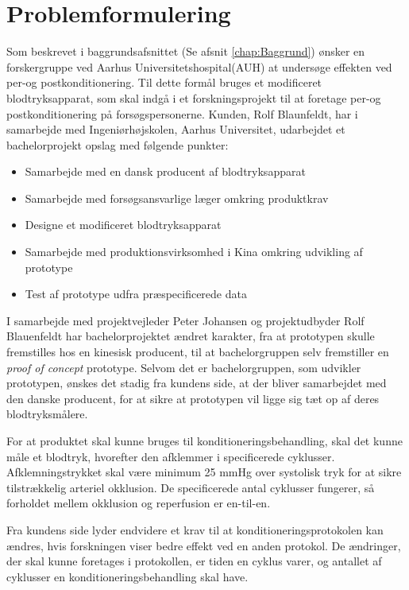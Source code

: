 \chapter{Problemformulering}\label{title:problemformulering}
Som beskrevet i baggrundsafsnittet (Se afsnit \ref{chap:Baggrund}) ønsker en forskergruppe ved Aarhus Universitetshospital(AUH) at undersøge effekten ved per-og postkonditionering. Til dette formål bruges et modificeret blodtryksapparat, som skal indgå i et forskningsprojekt til at foretage per-og postkonditionering på forsøgspersonerne. Kunden, Rolf Blaunfeldt, har i samarbejde med Ingeniørhøjskolen, Aarhus Universitet, udarbejdet et bachelorprojekt opslag med følgende punkter:
\begin{itemize}
	\item Samarbejde med en dansk producent af blodtryksapparat
	\item Samarbejde med forsøgsansvarlige læger omkring produktkrav
	\item Designe et modificeret blodtryksapparat
	\item Samarbejde med produktionsvirksomhed i Kina omkring udvikling af prototype 
	\item Test af prototype udfra præspecificerede data
\end{itemize}

I samarbejde med projektvejleder Peter Johansen og projektudbyder Rolf Blauenfeldt har bachelorprojektet ændret karakter, fra at prototypen skulle fremstilles hos en kinesisk producent, til at bachelorgruppen selv fremstiller en \textit{proof of concept} prototype. Selvom det er bachelorgruppen, som udvikler prototypen, ønskes det stadig fra kundens side, at der bliver samarbejdet med den danske producent, for at sikre at prototypen vil ligge sig tæt op af deres blodtryksmålere.

For at produktet skal kunne bruges til konditioneringsbehandling, skal det kunne måle et blodtryk, hvorefter den afklemmer i specificerede cyklusser. Afklemningstrykket skal være minimum 25 mmHg over systolisk tryk for at sikre tilstrækkelig arteriel okklusion. De specificerede antal cyklusser fungerer, så forholdet mellem okklusion og reperfusion er en-til-en. 

Fra kundens side lyder endvidere et krav til at konditioneringsprotokolen kan ændres, hvis forskningen viser bedre effekt ved en anden protokol. De ændringer, der skal kunne foretages i protokollen, er tiden en cyklus varer, og antallet af cyklusser en konditioneringsbehandling skal have. 

